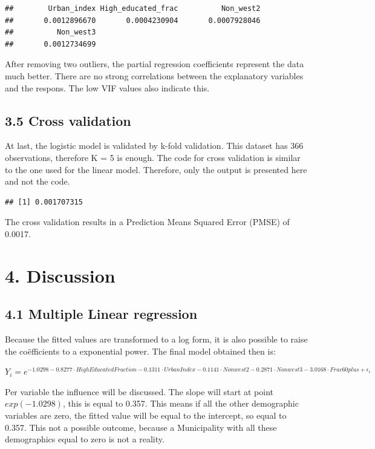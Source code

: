 \documentclass[11pt,]{article}
\begin{document}
\begin{verbatim}
##        Urban_index High_educated_frac          Non_west2 
##       0.0012896670       0.0004230904       0.0007928046 
##          Non_west3 
##       0.0012734699
\end{verbatim}

After removing two outliers, the partial regression coefficients
represent the data much better. There are no strong correlations between
the explanatory variables and the respons. The low VIF values also
indicate this.

\subsection{3.5 Cross validation}\label{cross-validation-1}

At last, the logistic model is validated by k-fold validation. This
dataset has 366 observations, therefore K = 5 is enough. The code for
cross validation is similar to the one used for the linear model.
Therefore, only the output is presented here and not the code.

\begin{verbatim}
## [1] 0.001707315
\end{verbatim}

The cross validation results in a Prediction Means Squared Error (PMSE)
of 0.0017.

\section{4. Discussion}\label{discussion}

\subsection{4.1 Multiple Linear
regression}\label{multiple-linear-regression-1}

Because the fitted values are transformed to a log form, it is also
possible to raise the coëfficients to a exponential power. The final
model obtained then is:

\(Y_i = e^{-1.0298 -0.8277 \cdot HighEducatedFraction -0.1311 \cdot Urban Index -0.1141 \cdot Non west2 -0.2871 \cdot Non west3 -3.0168 \cdot Frac 60plus + \epsilon_i}\)

Per variable the influence will be discussed. The slope will start at
point \(exp(-1.0298)\), this is equal to 0.357. This means if all the
other demographic variables are zero, the fitted value will be equal to
the intercept, so equal to 0.357. This not a possible outcome, because a
Municipality with all these demographics equal to zero is not a reality.
\end{document}
